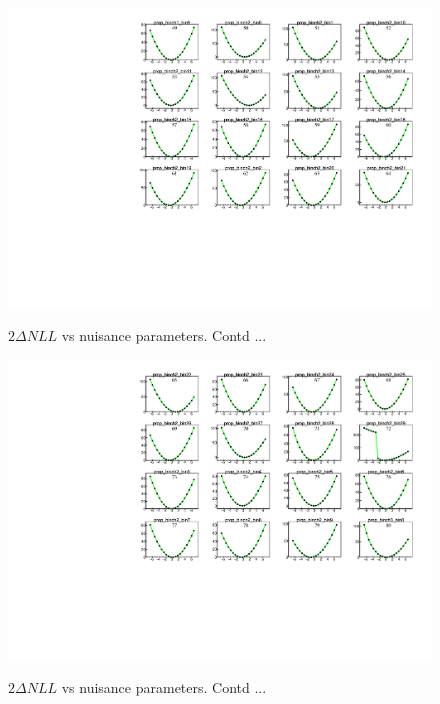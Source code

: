 \begin{figure}
    \centering  
    {\includegraphics[width=1.0\linewidth]{Image/MLFit/ScanNuis/scanNuis4.pdf}}
    \caption{  $2\Delta NLL$ vs nuisance parameters. Contd ...}
    \label{fig:nuisScan4}
\end{figure}
\begin{figure}
    \centering  
    {\includegraphics[width=1.0\linewidth]{Image/MLFit/ScanNuis/scanNuis5.pdf}}
    \caption{  $2\Delta NLL$ vs nuisance parameters. Contd ...}
    \label{fig:nuisScan5}
\end{figure}


